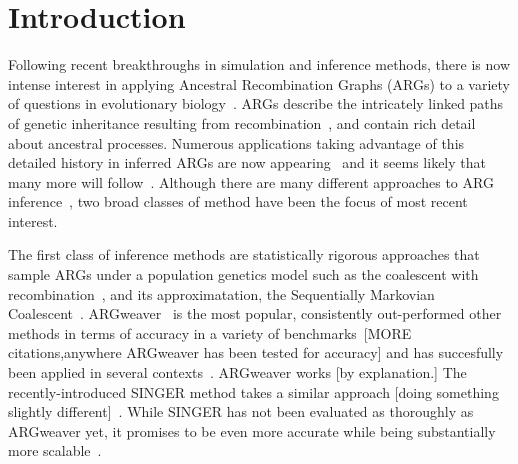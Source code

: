 \documentclass{article}
\begin{document}
\section*{Introduction}
Following recent breakthroughs in simulation and inference methods,
there is now intense interest in applying Ancestral Recombination Graphs (ARGs)
to a variety of questions in evolutionary
biology~\citep{lewanski_era_2024,brandt_promise_2024,nielsen_inference_2025}.
ARGs describe the intricately linked paths
of genetic inheritance resulting from
recombination~\citep{hudson_properties_1983,griffiths_ancestral_1996,wong_general_2023},
and contain rich detail about ancestral processes.
Numerous applications taking advantage of this detailed history
in inferred ARGs are now appearing~\citep{
stern_approximate_2019,
osmond_estimating_2021,
fan_genealogical_2022,
hejase_deep_2022,
guo_recombination-aware_2022,
ignatieva_ongoing_2022,
wang_complex_2022,
zhang_biobank-scale_2023,
nowbandegani_extremely_2023,
ignatieva_distribution_2023,
fan_likelihood_2023,
huang_estimating_2024,
grundler_geographic_2024,
korfmann_simultaneous_2024,
deraje_inferring_2024,
speidel2025high}
and it seems likely that many more will
follow~\citep{harris_database_2019,harris_using_2023}.
Although there are many different approaches to ARG
inference~\citep{wong_general_2023}, two broad classes of method
have been the focus of most recent interest.

The first class of inference methods are statistically rigorous approaches
that sample ARGs under a population genetics model such as the
coalescent with recombination~\citep{hudson_properties_1983},
and its approximatation, the Sequentially Markovian
Coalescent~\citep{mcvean_approximating_2005,marjoram_fast_2006}.
ARGweaver~\citep{rasmussen_genome-wide_2014} is the most popular,
consistently out-performed other methods in terms 
of accuracy in a variety of benchmarks~\citep{brandt2022evaluation}[MORE
citations,anywhere ARGweaver has been tested for accuracy]
and has succesfully been applied in several
contexts~\citep[e.g.][]{de_chimpanzee_2016,shriner_whole_2018,hejase_genomic_2020,
stankowski_genetic_2024}. 
ARGweaver works [by explanation.]
The recently-introduced SINGER method takes a similar approach [doing something 
slightly different]~\citep{deng_robust_2024}.
While SINGER has not been evaluated as thoroughly as ARGweaver yet, it promises
to be even more accurate while being substantially more
scalable~\citep{deng_robust_2024}. 
\end{document}

